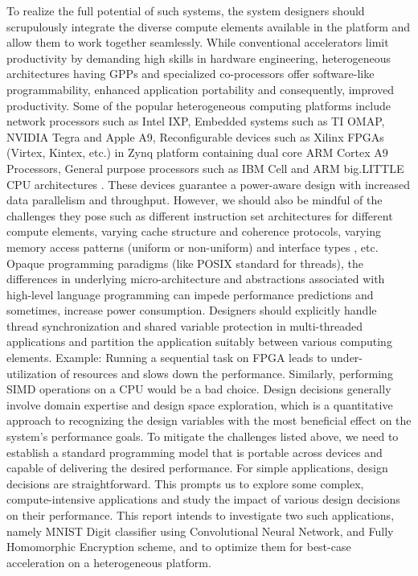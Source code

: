 To realize the full potential of such systems, the system designers should scrupulously integrate the diverse compute elements available in the platform and allow them to work together seamlessly. While conventional accelerators limit productivity by demanding high skills in hardware engineering, heterogeneous architectures having GPPs and specialized co-processors offer software-like programmability, enhanced application portability and consequently, improved productivity. Some of the popular heterogeneous computing platforms include network processors such as Intel IXP, Embedded systems such as TI OMAP, NVIDIA Tegra and Apple A9, Reconfigurable devices such as Xilinx FPGAs (Virtex, Kintex, etc.) in Zynq platform containing dual core ARM Cortex A9 Processors, General purpose processors such as IBM Cell and ARM big.LITTLE CPU architectures \cite{wiki_nanoscale}. \newline \newline
These devices guarantee a power-aware design with increased data parallelism and throughput. However, we should also be mindful of the challenges they pose such as different instruction set architectures for different compute elements, varying cache structure and coherence protocols, varying memory access patterns (uniform or non-uniform) and interface types \cite{wiki_nanoscale}, etc. Opaque programming paradigms (like POSIX standard for threads), the differences in underlying micro-architecture and abstractions associated with high-level language programming can impede performance predictions and sometimes, increase power consumption. Designers should explicitly handle thread synchronization and shared variable protection in multi-threaded applications and partition the application suitably between various computing elements. Example: Running a sequential task on FPGA leads to under-utilization of resources and slows down the performance. Similarly, performing SIMD operations on a CPU would be a bad choice. Design decisions generally involve domain expertise and design space exploration, which is a quantitative approach to recognizing the design variables with the most beneficial effect on the system’s performance goals. \newline \newline
To mitigate the challenges listed above, we need to establish a standard programming model that is portable across devices and capable of delivering the desired performance. 
For simple applications, design decisions are straightforward. This prompts us to explore some complex, compute-intensive applications and study the impact of various design decisions on their performance. This report intends to investigate two such applications, namely MNIST Digit classifier using Convolutional Neural Network, and Fully Homomorphic Encryption scheme, and to optimize them for best-case acceleration on a heterogeneous platform. 


